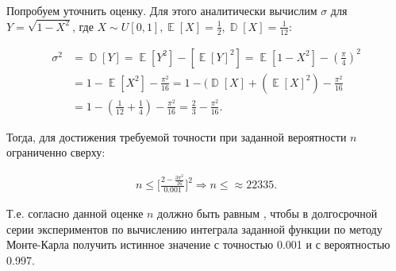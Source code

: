 \documentclass[a4paper,11pt]{article}
\DeclareMathOperator*{\D}{\mathbb{D}}   %
\DeclareMathOperator*{\E}{\mathbb{E}}   %
\begin{document}
Попробуем уточнить оценку. Для этого аналитически вычислим $\sigma$ для $Y = \sqrt{1-X^2}$, где $X \sim U[0,1], \E[X] = \frac{1}{2}, \D[X] = \frac{1}{12}$:

\begin{align*}
\sigma^2 &= \D[Y] = \E[Y^2] - [\E[Y]^2] = \E[1-X^2] - (\frac{\pi}{4})^2 \\
&= 1 - \E[X^2] - \frac{\pi^2}{16} = 1 - (\D[X] + (\E[X]^2) - \frac{\pi^2}{16} \\
&= 1 - (\frac{1}{12} + \frac{1}{4}) - \frac{\pi^2}{16} = \frac{2}{3} - \frac{\pi^2}{16}.
\end{align*}

Тогда, для достижения требуемой точности при заданной вероятности $n$ ограниченно сверху:

\begin{align*}
n \leq \bigg[\frac{2-\frac{3\pi^2}{16}}{0.001}\bigg]^2 \Rightarrow
\boxed{n \leq \approx 22335}.
\end{align*}

Т.е. согласно данной оценке $n$ должно быть равным , чтобы в долгосрочной серии экспериментов по вычислению интеграла заданной функции по методу Монте-Карла получить истинное значение с точностью 0.001 и с вероятностью 0.997.
\end{document}
